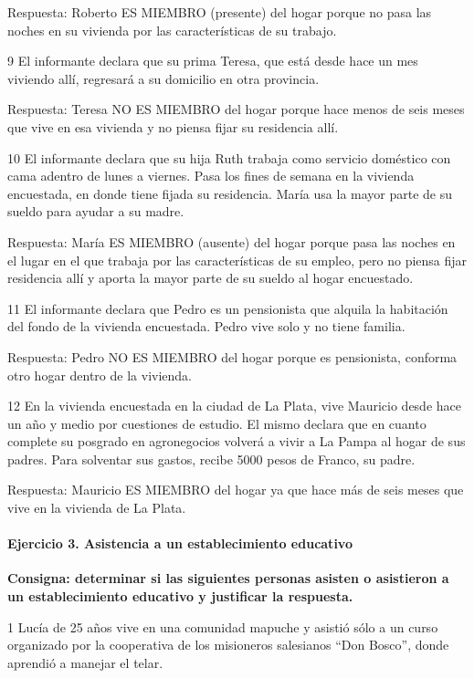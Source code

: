 \documentclass[
  openany]{book}
\begin{document}
Respuesta: Roberto ES MIEMBRO (presente) del hogar porque no pasa las noches en su vivienda por las características de su trabajo.

9 El informante declara que su prima Teresa, que está desde hace un mes viviendo allí, regresará a su domicilio en otra provincia.

Respuesta: Teresa NO ES MIEMBRO del hogar porque hace menos de seis meses que vive en esa vivienda y no piensa fijar su residencia allí.

10 El informante declara que su hija Ruth trabaja como servicio doméstico con cama adentro de lunes a viernes. Pasa los fines de semana en la vivienda encuestada, en donde tiene fijada su residencia. María usa la mayor parte de su sueldo para ayudar a su madre.

Respuesta: María ES MIEMBRO (ausente) del hogar porque pasa las noches en el lugar en el que trabaja por las características de su empleo, pero no piensa fijar residencia allí y aporta la mayor parte de su sueldo al hogar encuestado.

11 El informante declara que Pedro es un pensionista que alquila la habitación del fondo de la vivienda encuestada. Pedro vive solo y no tiene familia.

Respuesta: Pedro NO ES MIEMBRO del hogar porque es pensionista, conforma otro hogar dentro de la vivienda.

12 En la vivienda encuestada en la ciudad de La Plata, vive Mauricio desde hace un año y medio por cuestiones de estudio. El mismo declara que en cuanto complete su posgrado en agronegocios volverá a vivir a La Pampa al hogar de sus padres. Para solventar sus gastos, recibe 5000 pesos de Franco, su padre.

Respuesta: Mauricio ES MIEMBRO del hogar ya que hace más de seis meses que vive en la vivienda de La Plata.

\hypertarget{ejercicio-3.-asistencia-a-un-establecimiento-educativo-1}{%
\paragraph{Ejercicio 3. Asistencia a un establecimiento educativo}\label{ejercicio-3.-asistencia-a-un-establecimiento-educativo-1}}

\textbf{Consigna: determinar si las siguientes personas asisten o asistieron a un establecimiento educativo y justificar la respuesta.}

1 Lucía de 25 años vive en una comunidad mapuche y asistió sólo a un curso organizado por la cooperativa de los misioneros salesianos ``Don Bosco'', donde aprendió a manejar el telar.
\end{document}
